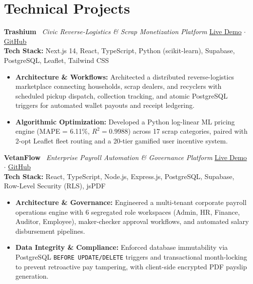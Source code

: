 \documentclass[10pt,a4paper]{article}
\begin{document}
\section*{Technical Projects}

\noindent
\textbf{Trashium} \textbar\ \textit{Civic Reverse-Logistics \& Scrap Monetization Platform} \hfill \href{https://www.trashium.com}{Live Demo} $\cdot$ \href{https://github.com/AmartyaSingh07/Trashium}{GitHub}\\
{\footnotesize\textbf{Tech Stack:} Next.js 14, React, TypeScript, Python (scikit-learn), Supabase, PostgreSQL, Leaflet, Tailwind CSS}
\begin{itemize}
\item \textbf{Architecture \& Workflows:} Architected a distributed reverse-logistics marketplace connecting households, scrap dealers, and recyclers with scheduled pickup dispatch, collection tracking, and atomic PostgreSQL triggers for automated wallet payouts and receipt ledgering.
\item \textbf{Algorithmic Optimization:} Developed a Python log-linear ML pricing engine (MAPE = 6.11\%, $R^2 = 0.9988$) across 17 scrap categories, paired with 2-opt Leaflet fleet routing and a 20-tier gamified user incentive system.
\end{itemize}
\vspace{1pt}

\noindent
\textbf{VetanFlow} \textbar\ \textit{Enterprise Payroll Automation \& Governance Platform} \hfill \href{https://vetanflow.vercel.app/}{Live Demo} $\cdot$ \href{https://github.com/FardeenAnsari/vetanflow}{GitHub}\\
{\footnotesize\textbf{Tech Stack:} React, TypeScript, Node.js, Express.js, PostgreSQL, Supabase, Row-Level Security (RLS), jsPDF}
\begin{itemize}
\item \textbf{Architecture \& Governance:} Engineered a multi-tenant corporate payroll operations engine with 6 segregated role workspaces (Admin, HR, Finance, Auditor, Employee), maker-checker approval workflows, and automated salary disbursement pipelines.
\item \textbf{Data Integrity \& Compliance:} Enforced database immutability via PostgreSQL \texttt{BEFORE UPDATE/DELETE} triggers and transactional month-locking to prevent retroactive pay tampering, with client-side encrypted PDF payslip generation.
\end{itemize}
\vspace{1pt}
\end{document}
